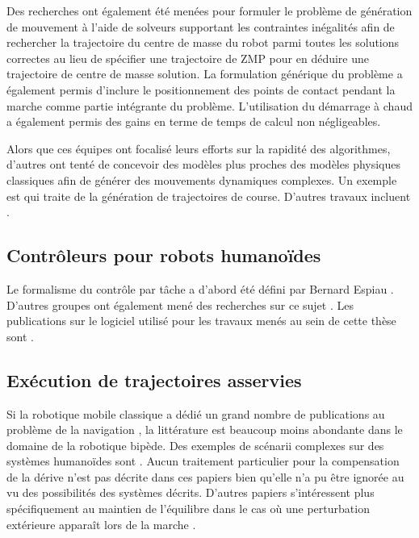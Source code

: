 Des recherches ont également été menées pour formuler le problème de
génération de mouvement à l'aide de solveurs supportant les
contraintes inégalités \cite{11dimitrov.icra,10herdt.ar} afin de
rechercher la trajectoire du centre de masse du robot parmi toutes les
solutions correctes au lieu de spécifier une trajectoire de ZMP pour
en déduire une trajectoire de centre de masse solution. La formulation
générique du problème a également permis d'inclure le positionnement
des points de contact pendant la marche comme partie intégrante du
problème. L'utilisation du démarrage à chaud \cite{09dimitrov.icra} a
également permis des gains en terme de temps de calcul non
négligeables.


Alors que ces équipes ont focalisé leurs efforts sur la rapidité des
algorithmes, d'autres ont tenté de concevoir des modèles plus proches
des modèles physiques classiques afin de générer des mouvements
dynamiques complexes. Un exemple est \cite{09mombaur.robotica} qui
traite de la génération de trajectoires de course. D'autres travaux
incluent \cite{07suleiman.humanoids,08kanehiro.rsj}.


\subsection{Contrôleurs pour robots humanoïdes}


Le formalisme du contrôle par tâche a d'abord été défini par Bernard
Espiau \cite{89iser.rives}. D'autres groupes ont également mené des
recherches sur ce sujet \cite{05sentis.icra}. Les publications sur le
logiciel utilisé pour les travaux menés au sein de cette thèse sont
\cite{09mansard.icar,05yoshida.humanoids,10kanoun.humanoids}.

\subsection{Exécution de trajectoires asservies}

Si la robotique mobile classique a dédié un grand nombre de
publications au problème de la navigation
\cite{91samson.icra,05lefebvre.icra}, la littérature est beaucoup
moins abondante dans le domaine de la robotique bipède. Des exemples
de scénarii complexes sur des systèmes humanoïdes sont
\cite{05michel.humanoids,10chestnutt,09chestnutt.rsj}. Aucun
traitement particulier pour la compensation de la dérive n'est pas
décrite dans ces papiers bien qu'elle n'a pu être ignorée au vu des
possibilités des systèmes décrits. D'autres papiers s'intéressent plus
spécifiquement au maintien de l'équilibre dans le cas où une
perturbation extérieure apparaît lors de la marche
\cite{07morisawa.icra}.


